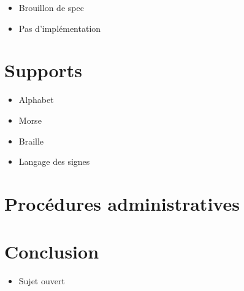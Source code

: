 \documentclass{beamer}
\begin{document}
\begin{frame}  
  \begin{itemize}
  \item Brouillon de spec
  \item Pas d'implémentation
  \end{itemize}
\end{frame}

\section{Supports}

\begin{frame}  
  \begin{itemize}
  \item Alphabet %
  \item Morse
  \item Braille
  \item Langage des signes
  \end{itemize}
\end{frame}

\section{Procédures administratives}

\begin{frame}
\end{frame}

\section{Conclusion}

\begin{frame}
  \begin{itemize}
  \item Sujet ouvert%
  \end{itemize}
\end{frame}
\end{document}
